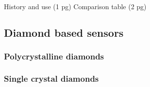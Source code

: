 \documentclass[12pt]{packages/mytustyle}  %
\begin{document}
History and use (1 pg)
Comparison table (2 pg)


\subsection{Diamond based sensors}
\subsubsection{Polycrystalline diamonds}
\subsubsection{Single crystal diamonds}




\end{document}
